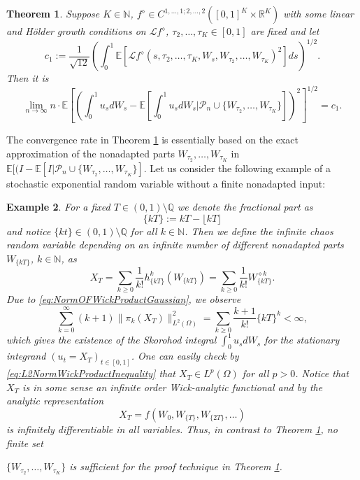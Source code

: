 \documentclass[a4paper,11pt,reqno]{amsart}
\theoremstyle{plain}
\newtheorem{theorem}{Theorem}
\newtheorem{example}[theorem]{Example}
\def\N{\mathbb{N}}
\def\Q{\mathbb{Q}}
\def\R{\mathbb{R}}
\def\P{\mathcal{P}}
\def\ex{\mathbb{E}}
\numberwithin{equation}{section}
\begin{document}
\begin{theorem}\label{theorem:OptimalApproxSkorohod}
Suppose $K\in \N$, $f^{\diamond} \in C^{1,\ldots, 1; 2,\ldots, 2}([0,1]^K\times \R^{K})$ with
some linear and H\"older growth conditions on $\mathcal{L} f^{\diamond}$, $\tau_2, \ldots, \tau_K \in [0,1]$ are fixed and let
\[
c_1:= \frac{1}{\sqrt{12}} \left(\int_{0}^{1} \ex[\mathcal{L} f^{\diamond}(s, \tau_2,\ldots, \tau_K,W_s,W_{\tau_2}, \ldots, W_{\tau_K})^2] ds\right)^{1/2}. 
\]
Then it is
\begin{equation*}
\lim\limits_{n \rightarrow \infty} n \cdot \ex\left[\left(\int_{0}^{1} u_s dW_s-\ex[\int_{0}^{1} u_s dW_s|\P_n \cup \{W_{\tau_2},\ldots, W_{\tau_K}\}]\right)^2\right]^{1/2} = c_1.
\end{equation*}
\end{theorem}
The convergence rate in  Theorem \ref{theorem:OptimalApproxSkorohod} is essentially based on the exact approximation of the nonadapted parts $W_{\tau_2}, \ldots, W_{\tau_K}$ in $\ex[(I-\ex[I|\P_n \cup \{W_{\tau_2},\ldots, W_{\tau_K}\}]$.
Let us consider the following example of a stochastic exponential random variable without a finite nonadapted input:

\begin{example}%
For a fixed $T \in (0,1) \setminus \Q$ we denote the fractional part as
\[
\{kT\} := kT - \lfloor kT \rfloor 
\]
and notice $\{kt\} \in (0,1) \setminus \Q$ for all $k \in \N$. Then we define the infinite chaos random variable depending on an infinite number of different nonadapted parts $W_{\{kT\}}$, $k \in \N$, as
\[
X_T = \sum_{k \geq 0} \frac{1}{k!} h^{k}_{\{kT\}}(W_{\{kT\}}) = \sum_{k \geq 0} \frac{1}{k!} W_{\{kT\}}^{\diamond k}. 
\]
Due to \eqref{eq:NormOFWickProductGaussian}, we observe
\[
\sum_{k=0}^{\infty} (k+1) \|\pi_k(X_T)\|^2_{L^2(\Omega)} = \sum_{k \geq 0} \frac{k+1}{k!} \{kT\}^k < \infty,
\]
which gives the existence of the Skorohod integral $\int_{0}^{1}u_s dW_s$ for the stationary integrand $(u_t= X_T)_{t \in [0,1]}$. One can easily check by \eqref{eq:L2NormWickProductInequality} that $X_T \in L^p(\Omega)$ for all $p>0$. Notice that $X_T$ is in some sense an infinite order Wick-analytic functional and by \cite[Proposition 10]{NP} the analytic representation 
\[
X_T = f(W_{0}, W_{\{T\}}, W_{\{2T\}}, \ldots) 
\]
is infinitely differentiable in all variables. 
Thus, in contrast to Theorem \ref{theorem:OptimalApproxSkorohod}, no finite set 

$\{W_{\tau_2},\ldots, W_{\tau_K}\}$ is sufficient for the proof technique in Theorem \ref{theorem:OptimalApproxSkorohod}.
\end{example}
\end{document}
